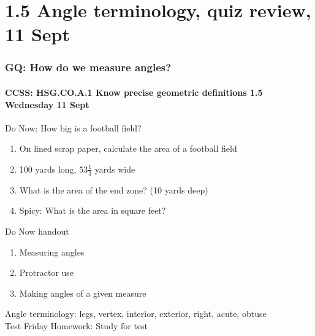 \documentclass{beamer}
\begin{document}
\section{1.5 Angle terminology, quiz review, 11 Sept}
  \frame
  {
    \frametitle{GQ: How do we measure angles?}
    \framesubtitle{CCSS: HSG.CO.A.1 Know precise geometric definitions \hfill \alert{1.5 Wednesday 11 Sept}}
 
    \begin{block}{Do Now: How big is a football field?}
      \begin{enumerate}
          \item On lined scrap paper, calculate the area of a football field
          \item 100 yards long, $53 \frac{1}{3}$ yards wide
          \item What is the area of the end zone? (10 yards deep)
          \item Spicy: What is the area in square feet?
      \end{enumerate}
      \end{block}
  
    \begin{block}{Do Now handout}
    \begin{enumerate}
        \item Measuring angles
        \item Protractor use
        \item Making angles of a given measure
    \end{enumerate}
    \end{block}
    Angle terminology: legs, vertex, interior, exterior, right, acute, obtuse\\
    \alert{Test Friday}
    Homework: Study for test
  }

    
\end{document}

